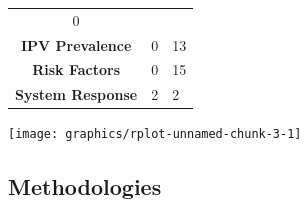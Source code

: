 \documentclass[]{tufte-handout}
\begin{document}
\begin{longtable}[]{@{}cll@{}}
\begin{minipage}[t]{0.22\columnwidth}
0\strut
\end{minipage}\tabularnewline
\begin{minipage}[t]{0.47\columnwidth}\centering\strut
\textbf{IPV Prevalence}\strut
\end{minipage} & \begin{minipage}[t]{0.22\columnwidth}\raggedright\strut
0\strut
\end{minipage} & \begin{minipage}[t]{0.22\columnwidth}\raggedright\strut
13\strut
\end{minipage}\tabularnewline
\begin{minipage}[t]{0.47\columnwidth}\centering\strut
\textbf{Risk Factors}\strut
\end{minipage} & \begin{minipage}[t]{0.22\columnwidth}\raggedright\strut
0\strut
\end{minipage} & \begin{minipage}[t]{0.22\columnwidth}\raggedright\strut
15\strut
\end{minipage}\tabularnewline
\begin{minipage}[t]{0.47\columnwidth}\centering\strut
\textbf{System Response}\strut
\end{minipage} & \begin{minipage}[t]{0.22\columnwidth}\raggedright\strut
2\strut
\end{minipage} & \begin{minipage}[t]{0.22\columnwidth}\raggedright\strut
2\strut
\end{minipage}\tabularnewline
\bottomrule
\end{longtable}

\texttt{[image: graphics/rplot-unnamed-chunk-3-1]}

\subsection{Methodologies}\label{methodologies}
\end{document}
